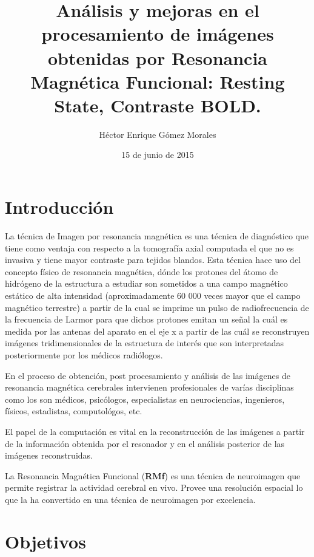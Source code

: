 \documentclass{article}
\author{Héctor Enrique Gómez Morales}
\title{Análisis y mejoras en el procesamiento de imágenes obtenidas por Resonancia Magnética Funcional: Resting State, Contraste BOLD.}
\date{15 de junio de 2015}
\begin{document}
\section{Introducción}

La técnica de Imagen por resonancia magnética es una técnica de diagnóstico que tiene como ventaja con respecto a la tomografía axial computada el que no es invasiva y tiene mayor contraste para tejidos blandos. Esta técnica hace uso del concepto físico de resonancia magnética, dónde los protones del átomo de hidrógeno de la estructura a estudiar son sometidos a una campo magnético estático de alta intensidad (aproximadamente 60 000 veces mayor que el campo magnético terrestre) a partir de la cual se imprime un pulso de radiofrecuencia de la frecuencia de Larmor para que dichos protones emitan un señal la cuál es medida por las antenas del aparato en el eje x a partir de las cuál se reconstruyen imágenes tridimensionales de la estructura de interés que son interpretadas posteriormente por los médicos radiólogos.

En el proceso de obtención, post procesamiento y análisis de las imágenes de resonancia magnética cerebrales intervienen profesionales de varías disciplinas como los son médicos, psicólogos, especialistas en neurociencias, ingenieros, físicos, estadistas, computológos, etc.

El papel de la computación es vital en la reconstrucción de las imágenes a partir de la información obtenida por el resonador y en el análisis posterior de las imágenes reconstruidas.

La Resonancia Magnética Funcional (\textbf{RMf}) es una técnica de neuroimagen que permite registrar la actividad cerebral en vivo. Provee una resolución espacial lo que la ha convertido en una técnica de neuroimagen por excelencia. 

\section{Objetivos}
\end{document}
